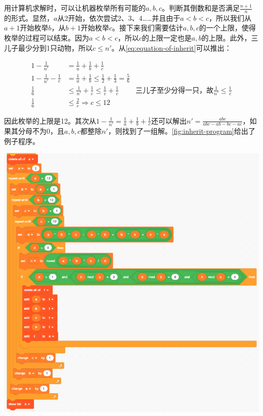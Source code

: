 \documentclass[b5paper]{ctexart}
\begin{document}
\begin{Answer}[ref={ex:fractions}]
{\vspace{3mm}
用计算机求解时，可以让机器枚举所有可能的$a, b, c$。判断其倒数和是否满足$\frac{n + 1}{n}$的形式。显然，$a$从2开始，依次尝试2、3、4……并且由于$a < b < c$，所以我们从$a+1$开始枚举$b$，从$b + 1$开始枚举$c$。接下来我们需要估计$a, b, c$的一个上限，使得枚举的过程可以结束。因为$a < b < c$，所以$c$的上限一定也是$a, b$的上限。此外，三儿子最少分到1只动物，所以$c \leq n'$。从\cref{eq:equation-of-inherit}可以推出：

\begin{align*}
  1 - \frac{1}{n'} &= \frac{1}{a} + \frac{1}{b} + \frac{1}{c} \\
  1 - \frac{1}{n'} - \frac{1}{c} &= \frac{1}{a} + \frac{1}{b} \leq \frac{1}{2} + \frac{1}{3} = \frac{5}{6} \\
  \frac{1}{6} &\leq \frac{1}{n'} + \frac{1}{c} \leq \frac{1}{c} + \frac{1}{c} & \text{三儿子至少分得一只，故} \frac{1}{n'} \leq \frac{1}{c} \\
  \frac{1}{6} &\leq \frac{2}{c} \Rightarrow c \leq 12
\end{align*}

因此枚举的上限是12。其次从$1 - \frac{1}{n'} = \frac{1}{a} + \frac{1}{b} + \frac{1}{c}$还可以解出$n' = \frac{abc}{abc - ab - bc - ac}$，如果其分母不为0，且$a, b, c$都整除$n'$，则找到了一组解。\cref{fig:inherit-program}给出了例子程序。

\begin{center}
 \includegraphics[scale=0.4]{img/inherit-program}
 \label{fig:inherit-program}
\end{center}

}
\end{Answer}
\end{document}
